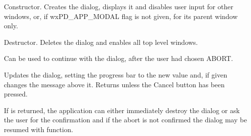 
\label{wxprogressdialogctor}


Constructor. Creates the dialog, displays it and disables user input
for other windows, or, if wxPD\_APP\_MODAL flag is not given, for its parent
window only.







\label{wxprogressdialogdtor}


Destructor. Deletes the dialog and enables all top level windows.

\label{wxprogressdialogresume}


Can be used to continue with the dialog, after the user had chosen
ABORT.

\label{wxprogressdialogupdate}


Updates the dialog, setting the progress bar to the new value and, if
given changes the message above it. Returns \true unless the Cancel button
has been pressed.

If \false is returned, the application can either immediately destroy the dialog
or ask the user for the confirmation and if the abort is not confirmed the
dialog may be resumed with  function.


